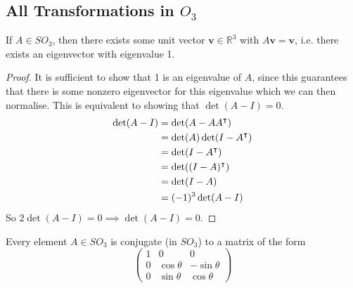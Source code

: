 \documentclass{article}
\begin{document}
\subsection{All Transformations in $O_3$}
\begin{theorem}
	If $A \in SO_3$, then there exists some unit vector $\bm v \in \mathbb R^3$ with $A\bm v = \bm v$, i.e. there exists an eigenvector with eigenvalue 1.
\end{theorem}
\begin{proof}
	It is sufficient to show that 1 is an eigenvalue of $A$, since this guarantees that there is some nonzero eigenvector for this eigenvalue which we can then normalise. This is equivalent to showing that $\det (A - I) = 0$.
	\begin{align*}
		\det(A - I) & = \det(A - AA^\intercal)       \\
		            & = \det(A)\det(I - A^\intercal) \\
		            & = \det(I - A^\intercal)        \\
		            & = \det((I - A)^\intercal)      \\
		            & = \det(I - A)                   \\
		            & = (-1)^3\det(A - I)
	\end{align*}
	So $2\det(A - I) = 0 \implies \det(A - I) = 0$.
\end{proof}
\begin{corollary}
	Every element $A \in SO_3$ is conjugate (in $SO_3$) to a matrix of the form
	\[ \begin{pmatrix}
			1 & 0           & 0            \\
			0 & \cos \theta & -\sin \theta \\
			0 & \sin \theta & \cos \theta
		\end{pmatrix} \]
\end{corollary}
\end{document}
